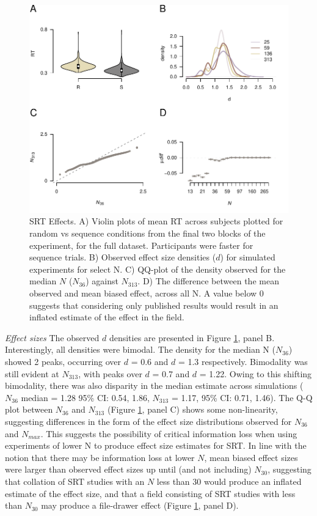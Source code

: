 \documentclass{article}
\begin{document}
\begin{figure}

{\centering \includegraphics[width=0.8\linewidth]{../images/IMMSRT_fx_main} 

}

\caption{SRT Effects. A) Violin plots of mean RT across subjects plotted for random vs sequence conditions from the final two blocks of the experiment, for the full dataset. Participants were faster for sequence trials. B) Observed effect size densities ($d$) for simulated experiments for select N. C) QQ-plot of the density observed for the median $N$ ($N_{36}$) against $N_{313}$. D) The difference between the mean observed and mean biased effect, across all N. A value below 0 suggests that considering only published results would result in an inflated estimate of the effect in the field.}\label{fig:SRTFX}
\end{figure}

\emph{Effect sizes} The observed \(d\) densities are presented in Figure \ref{fig:SRTFX}, panel B. Interestingly, all densities were bimodal. The density for the median N (\(N_{36}\)) showed 2 peaks, occurring over \(d\) = 0.6 and \(d\) = 1.3 respectively. Bimodality was still evident at \(N_{313}\), with peaks over \(d\) = 0.7 and \(d\) = 1.22. Owing to this shifting bimodality, there was also disparity in the median estimate across simulations (\(N_{36}\) median = 1.28 95\% CI: 0.54, 1.86, \(N_{313}\) = 1.17, 95\% CI: 0.71, 1.46). The Q-Q plot between \(N_{36}\) and \(N_{313}\) (Figure \ref{fig:SRTFX}, panel C) shows some non-linearity, suggesting differences in the form of the effect size distributions observed for \(N_{36}\) and \(N_{max}\). This suggests the possibility of critical information loss when using experiments of lower N to produce effect size estimates for SRT. In line with the notion that there may be information loss at lower \(N\), mean biased effect sizes were larger than observed effect sizes up until (and not including) \(N_{30}\), suggesting that collation of SRT studies with an \(N\) less than 30 would produce an inflated estimate of the effect size, and that a field consisting of SRT studies with less than \(N_{30}\) may produce a file-drawer effect (Figure \ref{fig:SRTFX}, panel D).
\end{document}
